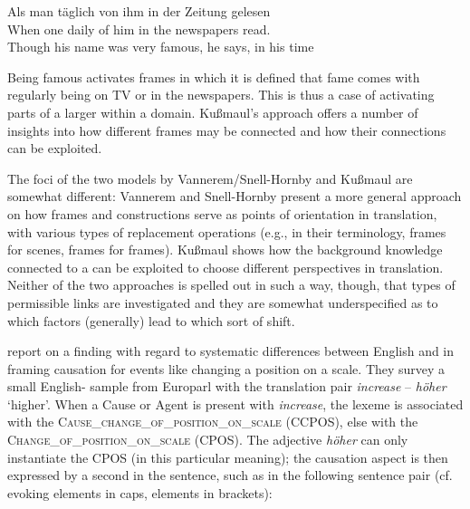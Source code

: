 \documentclass[output=paper]{LSP/langsci}
\begin{document}
\ea\label{czulo:ex:5}
\gll Als man täglich von ihm in der Zeitung gelesen \\
When one daily of him in the newspapers read. \\
\glt Though his name was very famous, he says, in his time
\z

Being famous activates frames in which it is defined that fame comes with regularly being on TV or in the newspapers. This is thus a case of activating parts of a larger  within a domain. Kußmaul's approach offers a number of insights into how different frames may be connected and how their connections can be exploited.

\largerpage
The foci of the two models by Vannerem/Snell-Hornby and Kußmaul are somewhat different: Vannerem and Snell-Hornby present a more general approach on how frames and constructions serve as points of orientation in translation, with various types of replacement operations (e.g., in their terminology, frames for scenes, frames for frames). Kußmaul shows how the background knowledge connected to a  can be exploited to choose different perspectives in translation. Neither of the two approaches is spelled out in such a way, though, that types of permissible links are investigated and they are somewhat underspecified as to which factors (generally) lead to which sort of shift.

\citet{Pado2005} report on a finding with regard to systematic differences between English and  in framing causation for events like changing a position on a scale. They survey a small English- sample from Europarl \citep{Koehn2005} with the translation pair \textit{increase} -- \textit{höher} `higher'. When a Cause or Agent is present with \textit{increase}, the lexeme is associated with the \textsc{Cause\_change\_of\_position\_on\_scale}  (CCPOS), else with the \textsc{Change\_of\_position\_on\_scale}  (CPOS). The  adjective \textit{höher} can only instantiate the \textsc{CPOS}  (in this particular meaning); the causation aspect is then expressed by a second  in the sentence, such as in the following sentence pair (cf. \citealt{Pado2005}  evoking elements in caps,  elements in brackets):  
\end{document}
